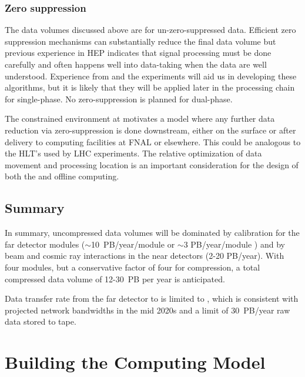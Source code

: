 \subsubsection{Zero suppression}

The data volumes discussed above are for un-zero-suppressed data.  Efficient zero suppression mechanisms can substantially reduce the final data volume but previous experience in HEP indicates that signal processing must be done carefully and often happens well into data-taking when the data are well understood.  Experience from   and the  experiments will aid us in developing these algorithms, but it is likely that they will be applied later in the processing chain for single-phase.  No zero-suppression is planned for dual-phase.

The constrained environment at \surf motivates a model where any further data reduction via zero-suppression is done downstream, either on the surface or after delivery to computing facilities at FNAL or elsewhere. This could be analogous to the HLT's used by LHC experiments. The relative optimization of data movement and processing location is an important consideration for the design of both the  and offline computing.

\subsection{Summary}
In summary, uncompressed data volumes will be dominated by calibration for the far detector modules ($\sim$10~PB/year/module  or $\sim$3 PB/year/module ) and by beam and cosmic ray interactions in the near detectors (2-20 PB/year).   With four  modules, but a conservative factor of four for compression, a total compressed data volume of 12-30~PB per year is anticipated. 


Data transfer rate from the far detector to \fnal  is limited to \surffnalbw, which is consistent with projected network bandwidths in the mid 2020s and a limit of 30~PB/year raw data stored to tape.  



\section{Building the Computing Model}\label{sw:bld-cmp-mdl}

